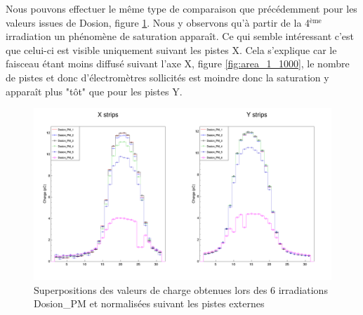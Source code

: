 \documentclass[a4paper,11pt]{article}
\begin{document}
Nous pouvons effectuer le même type de comparaison que précédemment pour les valeurs issues de Dosion, figure \ref{fig:ratio_PM}.
Nous y observons qu'à partir de la 4$^{\text{ème}}$ irradiation un phénomène de saturation apparaît.
Ce qui semble intéressant c'est que celui-ci est visible uniquement suivant les pistes X.
Cela s'explique car le faisceau étant moins diffusé suivant l'axe X, figure \ref{fig:area_1_1000}, le nombre de pistes et donc d'électromètres sollicités est moindre donc la saturation y apparaît plus "tôt" que pour les pistes Y.
\begin{figure}[h]
\begin{center}
\includegraphics[width=\linewidth]{Dosion_PM.png} 
\caption{\label{fig:ratio_PM}\footnotesize{Superpositions des valeurs de charge obtenues lors des 6 irradiations Dosion\_PM et normalisées suivant les pistes externes}}
\end{center}
\end{figure}
\end{document}
